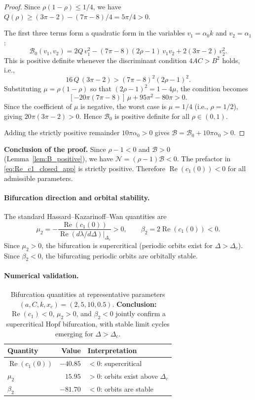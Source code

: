 \begin{proof}
Since $\rho(1-\rho)\le 1/4$, we have $Q(\rho)\ge (3\pi-2)-(7\pi-8)/4 = 5\pi/4 > 0$.

The first three terms form a quadratic form in the variables $v_1=\alpha_0 k$ and $v_2=\alpha_1$:
\[
\mathcal{B}_0(v_1,v_2) = 2Q\,v_1^2 - (7\pi{-}8)(2\rho{-}1)\,v_1 v_2 + 2(3\pi{-}2)\,v_2^2.
\]
This is positive definite whenever the discriminant condition $4AC > B^2$ holds, i.e.,
\[
16\,Q\,(3\pi-2) > (7\pi-8)^2(2\rho-1)^2.
\]
Substituting $\mu=\rho(1-\rho)$ so that $(2\rho-1)^2=1-4\mu$, the condition becomes
\[
[-20\pi(7\pi-8)]\,\mu + 95\pi^2-80\pi > 0.
\]
Since the coefficient of $\mu$ is negative, the worst case is $\mu=1/4$ (i.e., $\rho=1/2$), giving $20\pi(3\pi-2)>0$. Hence $\mathcal{B}_0$ is positive definite for all $\rho\in(0,1)$.

Adding the strictly positive remainder $10\pi\alpha_0>0$ gives $\mathcal{B} = \mathcal{B}_0 + 10\pi\alpha_0 > 0$.
\end{proof}

\noindent\textbf{Conclusion of the proof.}
Since $\rho-1<0$ and $\mathcal{B}>0$ (Lemma~\ref{lem:B_positive}), we have $\mathcal{N}=(\rho-1)\mathcal{B}<0$. The prefactor in \eqref{eq:Re_c1_closed_app} is strictly positive. Therefore $\operatorname{Re}(c_1(0))<0$ for all admissible parameters.

\medskip

\paragraph{Bifurcation direction and orbital stability.} The standard Hassard--Kazarinoff--Wan quantities are
\[
\mu_2 = -\frac{\operatorname{Re}(c_1(0))}{\operatorname{Re}(d\lambda/d\Delta)\big|_{\Delta_c}} > 0, \qquad
\beta_2 = 2\operatorname{Re}(c_1(0)) < 0.
\]
Since $\mu_2>0$, the bifurcation is supercritical (periodic orbits exist for $\Delta>\Delta_c$). Since $\beta_2<0$, the bifurcating periodic orbits are orbitally stable.

\paragraph{Numerical validation.}
\begin{table}[ht]
\centering
\begin{tabular}{lrl}
\toprule
Quantity & Value & Interpretation \\
\midrule
$\operatorname{Re}(c_1(0))$ & $-40.85$ & $<0$: supercritical \\
$\mu_2$ & $15.95$ & $>0$: orbits exist above $\Delta_c$ \\
$\beta_2$ & $-81.70$ & $<0$: orbits are stable \\
\bottomrule
\end{tabular}
\caption{Bifurcation quantities at representative parameters $(a,C,k,x_c)=(2,5,10,0.5)$. \textbf{Conclusion:} $\operatorname{Re}(c_1)<0$, $\mu_2>0$, and $\beta_2<0$ jointly confirm a supercritical Hopf bifurcation, with stable limit cycles emerging for $\Delta>\Delta_c$.}
\label{tab:hopf_numerics}
\end{table}

